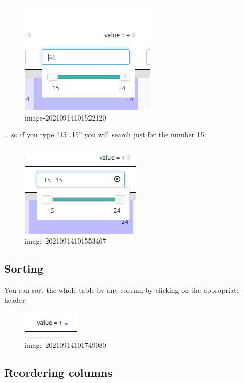 \documentclass[
]{book}
\begin{document}
\begin{figure}
\centering
\includegraphics{_assets/image-20210914101522120.png}
\caption{image-20210914101522120}
\end{figure}

\ldots{} so if you type ``15\ldots15'' you will search just for the number 15:

\begin{figure}
\centering
\includegraphics{_assets/image-20210914101553467.png}
\caption{image-20210914101553467}
\end{figure}

\hypertarget{sorting}{%
\subsection{Sorting}\label{sorting}}

You can sort the whole table by any column by clicking on the appropriate header:

\begin{figure}
\centering
\includegraphics{_assets/image-20210914101749080.png}
\caption{image-20210914101749080}
\end{figure}

\hypertarget{reordering-columns}{%
\subsection{Reordering columns}\label{reordering-columns}}
\end{document}
